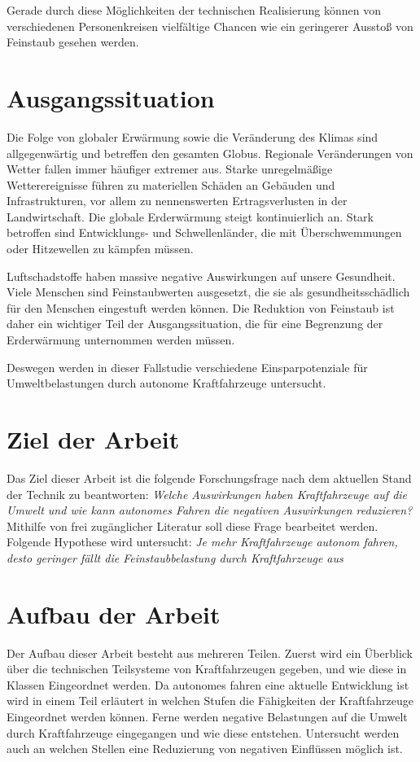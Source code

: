 Gerade durch diese Möglichkeiten der technischen Realisierung können von verschiedenen Personenkreisen
vielfältige Chancen wie ein geringerer Ausstoß von Feinstaub gesehen werden.

\section{Ausgangssituation}
Die Folge von globaler Erwärmung sowie die Veränderung des Klimas sind allgegenwärtig und betreffen den gesamten Globus.
Regionale Veränderungen von Wetter fallen immer häufiger extremer aus.
Starke unregelmäßige Wetterereignisse führen zu materiellen Schäden an Gebäuden und Infrastrukturen, vor allem zu nennenswerten Ertragsverlusten in der Landwirtschaft.
Die globale Erderwärmung steigt kontinuierlich an.
Stark betroffen sind Entwicklungs- und Schwellenländer, die mit Überschwemmungen oder Hitzewellen zu kämpfen müssen.


Luftschadstoffe haben massive negative Auswirkungen auf unsere Gesundheit.
Viele Menschen sind Feinstaubwerten ausgesetzt, die sie als gesundheitsschädlich für den Menschen eingestuft werden können.
Die Reduktion von Feinstaub ist daher ein wichtiger Teil der Ausgangssituation, die für eine Begrenzung der Erderwärmung unternommen werden müssen.

Deswegen werden in dieser Fallstudie verschiedene Einsparpotenziale für Umweltbelastungen durch autonome Kraftfahrzeuge untersucht.


\section{Ziel der Arbeit}
Das Ziel dieser Arbeit ist die folgende Forschungsfrage nach dem aktuellen Stand der Technik zu beantworten:
\textit{Welche Auswirkungen haben Kraftfahrzeuge auf die Umwelt und wie kann autonomes Fahren die negativen Auswirkungen reduzieren?}
Mithilfe von frei zugänglicher Literatur soll diese Frage bearbeitet werden.
Folgende Hypothese wird untersucht:
\textit{Je mehr Kraftfahrzeuge autonom fahren, desto geringer fällt die Feinstaubbelastung durch Kraftfahrzeuge aus}

\section{Aufbau der Arbeit}
Der Aufbau dieser Arbeit besteht aus mehreren Teilen.
Zuerst wird ein Überblick über die technischen Teilsysteme von Kraftfahrzeugen gegeben, und wie diese
in Klassen Eingeordnet werden.
Da autonomes fahren eine aktuelle Entwicklung ist wird in einem Teil erläutert in welchen Stufen die Fähigkeiten der Kraftfahrzeuge Eingeordnet werden können.
Ferne werden negative Belastungen auf die Umwelt durch Kraftfahrzeuge eingegangen und wie diese entstehen.
Untersucht werden auch an welchen Stellen eine Reduzierung von negativen Einflüssen möglich ist.

\newpage
